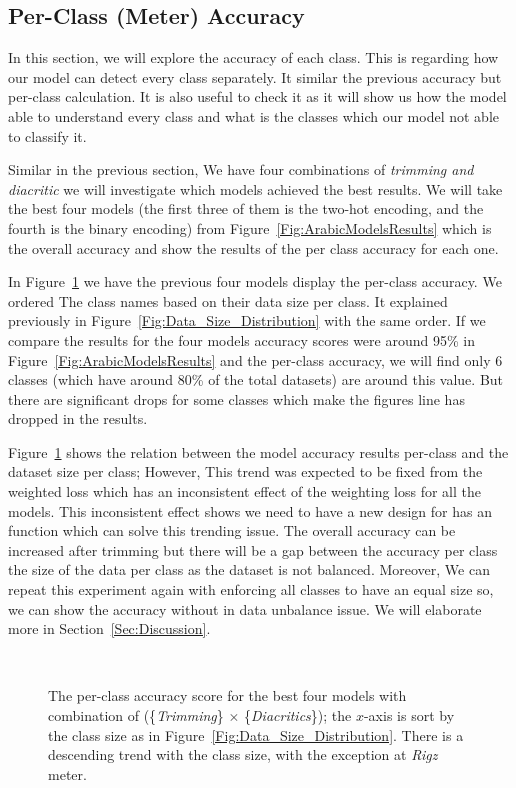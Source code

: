 \subsection{Per-Class (Meter) Accuracy}

In this section, we will explore the accuracy of each class. This is regarding how our model can detect every class separately. It similar the previous accuracy but per-class calculation. It is also useful to check it as it will show us how the model able to understand every class and what is the classes which our model not able to classify it. 

Similar in the previous section, We have four combinations of \textit{trimming and diacritic} we will investigate which models achieved the best results. We will take the best four models (the first three of them is the two-hot encoding, and the fourth is the binary encoding) from Figure~\ref{Fig:ArabicModelsResults} which is the overall accuracy and show the results of the per class accuracy for each one.

In Figure~\ref{Fig:Results_Per_Class} we have the previous four models display the per-class accuracy. We ordered The class names based on their data size per class. It explained previously in Figure~\ref{Fig:Data_Size_Distribution} with the same order. If we compare the results for the four models accuracy scores were around 95\% in Figure~\ref{Fig:ArabicModelsResults} and the per-class accuracy, we will find only 6 classes (which have around 80\% of the total datasets) are around this value. But there are significant drops for some classes which make the figures line has dropped in the results.

Figure~\ref{Fig:Results_Per_Class} shows the relation between the model accuracy results per-class and the dataset size per class; However, This trend was expected to be fixed from the weighted loss which has an inconsistent effect of the weighting loss for all the models. This inconsistent effect shows we need to have a new design for has an function which can solve this trending issue. The overall accuracy can be increased after trimming but there will be a gap between the accuracy per class the size of the data per class as the dataset is not balanced. Moreover, We can repeat this experiment again with enforcing all classes to have an equal size so, we can show the accuracy without in data unbalance issue. We will elaborate more in Section~\ref{Sec:Discussion}.

\begin{figure}[!t]
  
  \caption{The per-class accuracy score for the best four models with combination of (\{\textit{Trimming}\} $\times$ \{\textit{Diacritics}\}); the $x$-axis is sort by the class size as in Figure~\ref{Fig:Data_Size_Distribution}. There is a descending trend with the class size, with the exception at \textit{Rigz} meter.}~\label{Fig:Results_Per_Class}
\end{figure}

